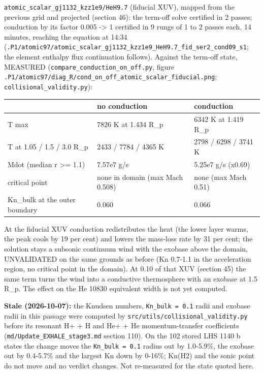 \documentclass[english,a4paper]{my_memo}
\begin{document}
\texttt{atomic\_scalar\_gj1132\_kzz1e9/HeH9.7} (fiducial XUV), mapped from the
previous grid and projected (section 46): the term-off solve certified in 2
passes; conduction by its factor 0.005 -\textgreater{} 1 certified in 9 rungs of 1 to 2
passes each, 14 minutes, reaching the equation at 14:34
(\texttt{.P1/atomic97/atomic\_scalar\_gj1132\_kzz1e9\_HeH9.7\_fid\_ser2\_cond09\_s1}; the
element enthalpy flux continuation follows). Against the term-off state,
MEASURED (\texttt{compare\_conduction\_on\_off.py}, figure
\texttt{.P1/atomic97/diag\_R/cond\_on\_off\_atomic\_scalar\_fiducial.png};
\texttt{collisional\_validity.py}):

{\def\LTcaptype{none} %
{\small
\begin{longtable}[]{@{}lll@{}}
\toprule\noalign{}
& no conduction & conduction \\
\midrule\noalign{}
\endhead
\bottomrule\noalign{}
\endlastfoot
T max & 7826 K at 1.434 R\_p & 6342 K at 1.419 R\_p \\
T at 1.05 / 1.5 / 3.0 R\_p & 2433 / 7784 / 4365 K & 2798 / 6298 / 3741 K \\
Mdot (median r \textgreater= 1.1) & 7.57e7 g/s & 5.25e7 g/s (x0.69) \\
critical point & none in domain (max Mach 0.508) & none (max Mach 0.51) \\
Kn\_bulk at the outer boundary & 0.060 & 0.066 \\
\end{longtable}
}
}

At the fiducial XUV conduction redistributes the heat (the lower layer
warms, the peak cools by 19 per cent) and lowers the mass-loss rate by 31
per cent; the solution stays a subsonic continuum wind with the exobase
above the domain, UNVALIDATED on the same grounds as before (Kn 0.7-1.1 in
the acceleration region, no critical point in the domain). At 0.10 of that
XUV (section 45) the same term turns the wind into a conductive thermosphere
with an exobase at 1.5 R\_p. The effect on the He 10830 equivalent width is
not yet computed.

\textbf{Stale (2026-10-07):} the Knudsen numbers, \texttt{Kn\_bulk\ =\ 0.1} radii and exobase radii in this passage were computed by \texttt{src/utils/collisional\_validity.py} before its resonant H+ + H and He+ + He momentum-transfer coefficients (\texttt{md/Update\_EXHALE\_stage3.md} section 110). On the 102 stored LHS 1140 b states the change moves the \texttt{Kn\_bulk\ =\ 0.1} radius out by 1.0-5.9\%, the exobase out by 0.4-5.7\% and the largest Kn down by 0-16\%; Kn(H2) and the sonic point do not move and no verdict changes. Not re-measured for the state quoted here.
\end{document}
